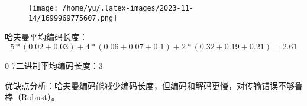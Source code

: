 \documentclass[14pt]{extarticle}
\begin{document}
\begin{figure}[H]
    \centering
    \texttt{[image: /home/yu/.latex-images/2023-11-14/1699969775607.png]}
\end{figure}


哈夫曼平均编码长度：
\begin{equation}
    5*(0.02+0.03)+ 4*(0.06+0.07+0.1) +2*(0.32+0.19+0.21)=2.61
\end{equation}

0-7二进制平均编码长度：3


优缺点分析：哈夫曼编码能减少编码长度，但编码和解码更慢，对传输错误不够鲁棒（Robust）。
\end{document}
